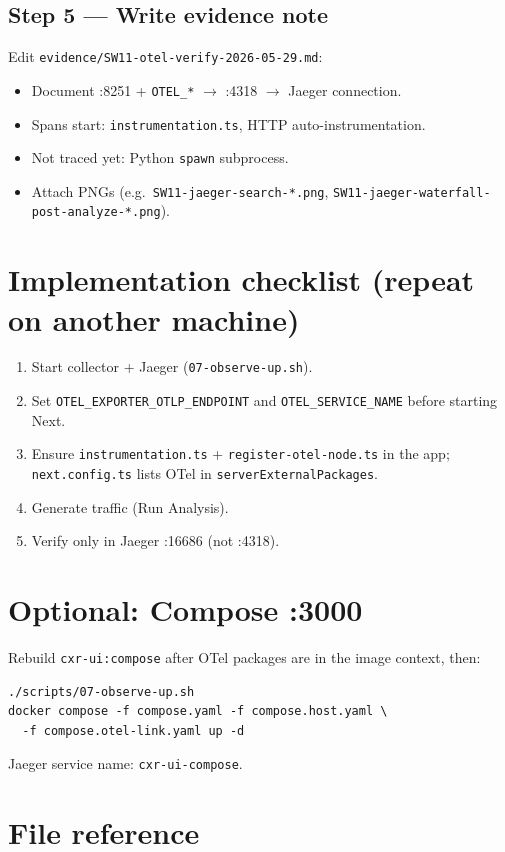 \documentclass[11pt,a4paper]{report}
\begin{document}
\section{Step 5 --- Write evidence note}
Edit \texttt{evidence/SW11-otel-verify-2026-05-29.md}:
\begin{itemize}
  \item Document :8251 + \texttt{OTEL\_*} $\rightarrow$ :4318 $\rightarrow$ Jaeger connection.
  \item Spans start: \texttt{instrumentation.ts}, HTTP auto-instrumentation.
  \item Not traced yet: Python \texttt{spawn} subprocess.
  \item Attach PNGs (e.g.\ \texttt{SW11-jaeger-search-*.png}, \texttt{SW11-jaeger-waterfall-post-analyze-*.png}).
\end{itemize}

\chapter{Implementation checklist (repeat on another machine)}

\begin{enumerate}
  \item Start collector + Jaeger (\texttt{07-observe-up.sh}).
  \item Set \texttt{OTEL\_EXPORTER\_OTLP\_ENDPOINT} and \texttt{OTEL\_SERVICE\_NAME} before starting Next.
  \item Ensure \texttt{instrumentation.ts} + \texttt{register-otel-node.ts} in the app; \texttt{next.config.ts} lists OTel in \texttt{serverExternalPackages}.
  \item Generate traffic (Run Analysis).
  \item Verify only in Jaeger :16686 (not :4318).
\end{enumerate}

\chapter{Optional: Compose :3000}

Rebuild \texttt{cxr-ui:compose} after OTel packages are in the image context, then:
\begin{lstlisting}[style=bash]
./scripts/07-observe-up.sh
docker compose -f compose.yaml -f compose.host.yaml \
  -f compose.otel-link.yaml up -d
\end{lstlisting}
Jaeger service name: \texttt{cxr-ui-compose}.

\chapter{File reference}
\end{document}
